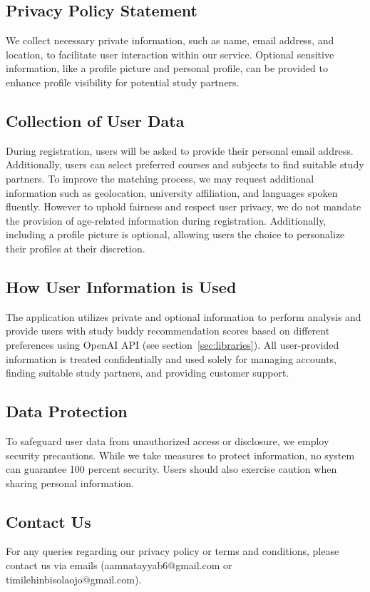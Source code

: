 \subsection{Privacy Policy Statement}
We collect necessary private information, such as name, email address, and location, to facilitate user interaction within our service. Optional sensitive information, like a profile picture and personal profile, can be provided to enhance profile visibility for potential study partners.
\subsection{Collection of User Data}
During registration, users will be asked to provide their personal email address. Additionally, users can select preferred courses and subjects to find suitable study partners. To improve the matching process, we may request additional information such as geolocation, university affiliation, and languages spoken fluently. However to uphold fairness and respect user privacy, we do not mandate the provision of age-related information during registration. Additionally, including a profile picture is optional, allowing users the choice to personalize their profiles at their discretion.
\subsection{How User Information is Used}
The application utilizes private and optional information to perform analysis and provide users with study buddy recommendation scores based on different preferences using OpenAI API (see section~\ref{sec:libraries}). All user-provided information is treated confidentially and used solely for managing accounts, finding suitable study partners, and providing customer support.

\subsection{Data Protection}
To safeguard user data from unauthorized access or disclosure, we employ security precautions. While we take measures to protect information, no system can guarantee 100 percent security. Users should also exercise caution when sharing personal information.
\subsection{Contact Us}
For any queries regarding our privacy policy or terms and conditions, please contact us via emails (aamnatayyab6@gmail.com or timilehinbisolaojo@gmail.com).
